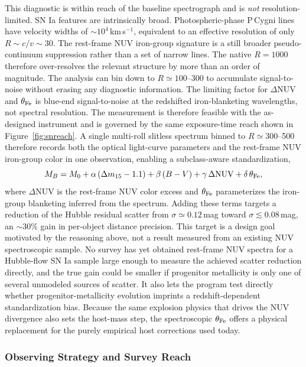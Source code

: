 \documentclass[10pt,onecolumn]{article}
\newcommand{\kms}{km\,s$^{-1}$}
\begin{document}
This diagnostic is within reach of the baseline spectrograph and is \emph{not} resolution-limited. SN Ia features are intrinsically broad. Photospheric-phase P\,Cygni lines have velocity widths of $\sim$$10^4$\,\kms, equivalent to an effective resolution of only $R\sim c/v\sim30$. The rest-frame NUV iron-group signature is a still broader pseudo-continuum suppression rather than a set of narrow lines. The native $R=1000$ therefore over-resolves the relevant structure by more than an order of magnitude. The analysis can bin down to $R\simeq100$--300 to accumulate signal-to-noise without erasing any diagnostic information. The limiting factor for $\Delta\mathrm{NUV}$ and $\theta_{\rm Fe}$ is blue-end signal-to-noise at the redshifted iron-blanketing wavelengths, not spectral resolution. The measurement is therefore feasible with the as-designed instrument and is governed by the same exposure-time reach shown in Figure~\ref{fig:snreach}. A single multi-roll slitless spectrum binned to $R\simeq300$--500 therefore records both the optical light-curve parameters and the rest-frame NUV iron-group color in one observation, enabling a subclass-aware standardization,
\begin{equation}
M_B = M_0 + \alpha\,(\Delta m_{15}-1.1) + \beta\,(B-V) + \gamma\,\Delta\mathrm{NUV} + \delta\,\theta_{\rm Fe},
\label{eq:nuvstd}
\end{equation}
where $\Delta\mathrm{NUV}$ is the rest-frame NUV color excess and $\theta_{\rm Fe}$ parameterizes the iron-group blanketing inferred from the spectrum. Adding these terms targets a reduction of the Hubble residual scatter from $\sigma\simeq0.12$\,mag toward $\sigma\lesssim0.08$\,mag, an $\sim30\%$ gain in per-object distance precision. This target is a design goal motivated by the reasoning above, not a result measured from an existing NUV spectroscopic sample. No survey has yet obtained rest-frame NUV spectra for a Hubble-flow SN Ia sample large enough to measure the achieved scatter reduction directly, and the true gain could be smaller if progenitor metallicity is only one of several unmodeled sources of scatter. It also lets the program test directly whether progenitor-metallicity evolution imprints a redshift-dependent standardization bias. Because the same explosion physics that drives the NUV divergence also sets the host-mass step, the spectroscopic $\theta_{\rm Fe}$ offers a physical replacement for the purely empirical host corrections used today.

\subsubsection{Observing Strategy and Survey Reach}
\end{document}

